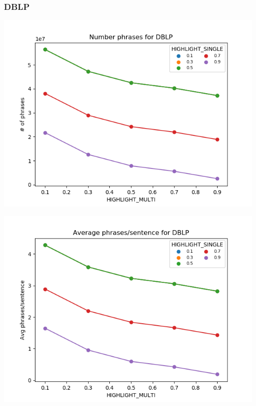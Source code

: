 \documentclass[11pt]{article}
\begin{document}
\subsubsection*{DBLP}
\begin{multicols}{2}
\includegraphics[scale=0.3]{n_phrases_dblp.png}

\includegraphics[scale=0.3]{avg_phrases_dblp.png}
\end{multicols}
\end{document}
